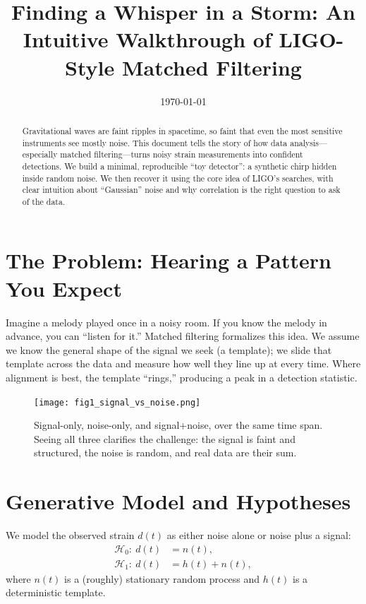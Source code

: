 \documentclass[11pt,a4paper]{article}
\title{Finding a Whisper in a Storm: An Intuitive Walkthrough of LIGO-Style Matched Filtering}
\author{}
\date{\today}
\begin{document}
\maketitle

\begin{abstract}
Gravitational waves are faint ripples in spacetime, so faint that even the most sensitive instruments see mostly noise. This document tells the story of how data analysis---especially matched filtering---turns noisy strain measurements into confident detections. We build a minimal, reproducible ``toy detector'': a synthetic chirp hidden inside random noise. We then recover it using the core idea of LIGO's searches, with clear intuition about ``Gaussian'' noise and why correlation is the right question to ask of the data.
\end{abstract}

\section{The Problem: Hearing a Pattern You Expect}
Imagine a melody played once in a noisy room. If you know the melody in advance, you can ``listen for it.'' Matched filtering formalizes this idea. We assume we know the general shape of the signal we seek (a template); we slide that template across the data and measure how well they line up at every time. Where alignment is best, the template ``rings,'' producing a peak in a detection statistic.

\begin{figure}[h!]\centering
\texttt{[image: fig1\_signal\_vs\_noise.png]}
\caption{Signal-only, noise-only, and signal+noise, over the same time span. Seeing all three clarifies the challenge: the signal is faint and structured, the noise is random, and real data are their sum.}
\label{fig:signalvnoise}
\end{figure}

\section{Generative Model and Hypotheses}
We model the observed strain $d(t)$ as either noise alone or noise plus a signal:
\begin{align}
\mathcal{H}_0:~ d(t) &= n(t), \label{eq:h0}\\
\mathcal{H}_1:~ d(t) &= h(t) + n(t), \label{eq:h1}
\end{align}
where $n(t)$ is a (roughly) stationary random process and $h(t)$ is a deterministic template.
\end{document}
